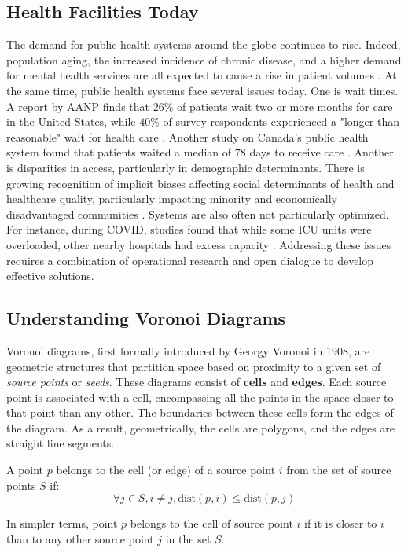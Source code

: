 \documentclass{article}
\begin{document}
\subsection{Health Facilities Today}
The demand for public health systems around the globe continues to rise. Indeed, population aging, the increased incidence of chronic disease, and a higher demand for mental health services are all expected to cause a rise in patient volumes \cite{aha-rise}. At the same time, public health systems face several issues today. One is wait times. A report by AANP finds that $26\%$ of patients wait two or more months for care in the United States, while $40\%$ of survey respondents experienced a "longer than reasonable" wait for health care \cite{aanp-wait}. Another study on Canada's public health system found that patients waited a median of 78 days to receive care \cite{canada-wait}.  Another is disparities in access, particularly in demographic determinants. There is growing recognition of implicit biases affecting social determinants of health and healthcare quality, particularly impacting minority and economically disadvantaged communities \cite{race-disparity}. Systems are also often not particularly optimized. For instance, during COVID, studies found that while some ICU units were overloaded, other nearby hospitals had excess capacity \cite{covid-imbalance}. Addressing these issues requires a combination of operational research and open dialogue to develop effective solutions.


\subsection{Understanding Voronoi Diagrams}
Voronoi diagrams, first formally introduced by Georgy Voronoi in 1908, are geometric structures that partition space based on proximity to a given set of \textit{source points} or \textit{seeds}. These diagrams consist of \textbf{cells} and \textbf{edges}. Each source point is associated with a cell, encompassing all the points in the space closer to that point than any other. The boundaries between these cells form the edges of the diagram. As a result, geometrically, the cells are polygons, and the edges are straight line segments.

A point $p$ belongs to the cell (or edge) of a source point $i$ from the set of source points $S$ if:
$$
\forall j \in S,  i \neq j, \mathrm{dist}(p, i) \leq \mathrm{dist}(p, j)
$$

In simpler terms, point $p$ belongs to the cell of source point $i$ if it is closer to $i$ than to any other source point $j$ in the set $S$. 
\end{document}
